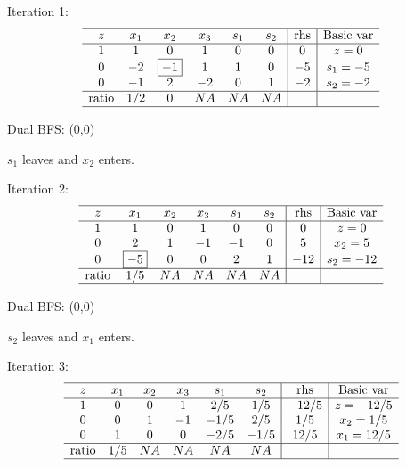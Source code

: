 \documentclass[12pt]{article}
\begin{document}
Iteration 1: 
\begin{equation*}
  \begin{array}{cccccc|c|c}
    \hline
    z &  x_1      &  x_2 &  x_3 &  s_1 & s_2 &   \text{rhs} & \text{Basic var}  \\ \hline
    1 &    1      &    0 &    1 &    0 & 0    & 0        &  z=0              \\
    0 &    -2      &    \boxed{-1} &    1 &    1 &    0 & -5        &  s_1 = -5          \\
    0 &    -1      &    2 &    -2 &    0 &    1 & -2        &  s_2 = -2          \\ \hline
    \text{ratio} &    1/2      &    0 &    NA &    NA &    NA &         &           \\ \hline
  \end{array}
\end{equation*}

Dual BFS: (0,0)

$s_1$ leaves and $x_2$ enters.


Iteration 2: 
\begin{equation*}
  \begin{array}{cccccc|c|c}
    \hline
    z &  x_1      &  x_2 &  x_3 &  s_1 & s_2 &   \text{rhs} & \text{Basic var}  \\ \hline
    1 &    1      &    0 &    1 &    0 & 0    & 0        &  z=0              \\
    0 &    2      &    1 &    -1 &    -1 &    0 & 5        &  x_2 = 5          \\
    0 &    \boxed{-5}      &    0 &    0 &    2 &    1 & -12        &  s_2 = -12          \\ \hline
    \text{ratio} &    1/5      &    NA &    NA &    NA &    NA &         &           \\ \hline
  \end{array}
\end{equation*}

Dual BFS: (0,0)

$s_2$ leaves and $x_1$ enters.

Iteration 3:
\begin{equation*}
  \begin{array}{cccccc|c|c}
    \hline
    z &  x_1      &  x_2 &  x_3 &  s_1 & s_2 &   \text{rhs} & \text{Basic var}  \\ \hline
    1 &    0      &    0 &    1 &    2/5 & 1/5    & -12/5        &  z=-12/5              \\
    0 &    0      &    1 &    -1 &    -1/5 &    2/5 & 1/5        &  x_2 = 1/5          \\
    0 &    1      &    0 &    0 &    -2/5 &    -1/5 & 12/5        &  x_1 = 12/5          \\ \hline
    \text{ratio} &    1/5      &    NA &    NA &    NA &    NA &         &           \\ \hline
  \end{array}
\end{equation*}
\end{document}
